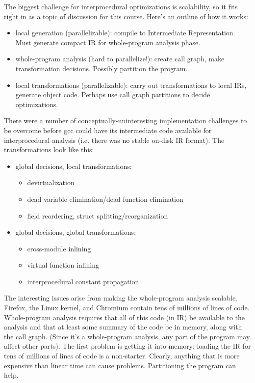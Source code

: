 \documentclass[a4paper]{report}
\begin{document}
The biggest challenge for interprocedural optimizations is scalability, so 
it fits right in as a topic of discussion for this course.
Here's an outline of how it works:
\begin{itemize}[noitemsep]
\item local generation (parallelizable): compile to Intermediate Representation. Must generate compact
IR for whole-program analysis phase.
\item whole-program analysis (hard to parallelize!): create call graph, make transformation decisions. Possibly partition
the program.
\item local transformations (parallelizable): carry out transformations to local IRs, generate object code.
Perhaps use call graph partitions to decide optimizations. 
\end{itemize}
There were a number of conceptually-uninteresting implementation
challenges to be overcome before gcc could have its intermediate code available for
interprocedural analysis (i.e. there was no stable on-disk IR format). The transformations look like this:
\begin{itemize}[noitemsep]
\item global decisions, local transformations:
\begin{itemize}[noitemsep]
\item devirtualization
\item dead variable elimination/dead function elimination
\item field reordering, struct splitting/reorganization
\end{itemize}
\item global decisions, global transformations:
\begin{itemize}[noitemsep]
\item cross-module inlining
\item virtual function inlining
\item interprocedural constant propagation
\end{itemize}
\end{itemize}
The interesting issues arise from making the whole-program analysis scalable. Firefox, the Linux kernel,
and Chromium contain tens of millions of lines of code. Whole-program analysis requires that all of 
this code (in IR) be available to the analysis and that at least some summary of the code be in memory, 
along with the call graph.
(Since it's a whole-program analysis, any part of the program may affect other parts). The first problem
is getting it into memory; loading the IR for tens of millions of lines of code is a non-starter.
Clearly, anything that is more expensive than linear time can cause problems. Partitioning the program
can help.
\end{document}
